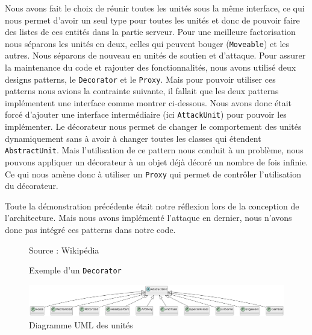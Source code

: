 Nous avons fait le choix de réunir toutes les unités sous la même interface, ce qui nous permet d'avoir un seul type pour toutes les unités et donc de pouvoir faire des listes de ces entités dans la partie serveur.
Pour une meilleure factorisation nous séparons les unités en deux, celles qui peuvent bouger (\lstinline{Moveable}) et les autres. Nous séparons de nouveau en unités de soutien et d'attaque. Pour assurer la maintenance du code et rajouter des fonctionnalités, nous avons utilisé deux designs patterns, le \lstinline{Decorator} et le \lstinline{Proxy}. Mais pour pouvoir utiliser ces patterns nous avions la contrainte suivante, il fallait que les deux patterns implémentent une interface comme montrer ci-dessous. Nous avons donc était forcé d'ajouter une interface intermédiaire (ici \lstinline{AttackUnit}) pour pouvoir les implémenter. Le décorateur nous permet de changer le comportement des unités dynamiquement sans à avoir à changer toutes les classes qui étendent \lstinline{AbstractUnit}. Mais l'utilisation de ce pattern nous conduit à un problème, nous pouvons appliquer un décorateur à un objet déjà décoré un nombre de fois infinie. Ce qui nous amène donc à utiliser un \lstinline{Proxy} qui permet de contrôler l'utilisation du décorateur.

Toute la démonstration précédente était notre réflexion lors de la conception de l'architecture. Mais nous avons implémenté l'attaque en dernier, nous n'avons donc pas intégré ces patterns dans notre code.

\begin{figure}[H]
    \centering
    \def\stackalignment{r}
    {\scriptsize%
        Source : Wikipédia}
    \caption{Exemple d'un {\tt Decorator}}
    \label{fig:UML_Decorator_Pattern_Example}
\end{figure}


\begin{figure}[H]
    \centering
    \includegraphics[scale=0.3]{data/uml_abstract_unit.png}
    \caption{Diagramme UML des unités}
    \label{fig:uml_abstract_unit}
\end{figure}

